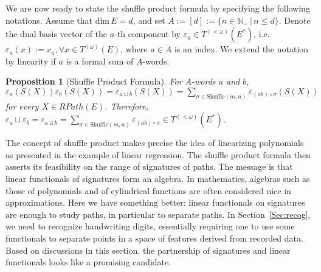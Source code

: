\documentclass[fleqn]{article}
\newtheorem{prop}[thm]{Proposition}
\theoremstyle{definition}
\theoremstyle{remark}
\begin{document}
\par
We are now ready to state the shuffle product formula by specifying the following notations. Assume that $\mathrm{dim}\,E =d$, and set $A:=[d]:=\{n\in\mathbb{N}_+ \,\big|\, n\le d\}$. Denote the dual basis vector of the $a$-th component by $\varepsilon_a \in T^{(<\omega)}(E^*)$, i.e. $\varepsilon_a(x):=x_a,\forall x\in T^{(\omega)}(E)$, where $a\in A$ is an index. We extend the notation by linearity if $a$ is a formal sum of $A$-words.
\begin{prop}[Shuffle Product Formula]
For $A$-words $a$ and $b$, $\varepsilon_a(S(X)) \varepsilon_b(S(X)) = \varepsilon_{a\sqcup b}(S(X)) = \sum_{\sigma\in \mathrm{Shuffle}(m,n)}\varepsilon_{(ab)\circ\sigma}(S(X))$ for every $X\in RPath(E)$. Therefore, $\varepsilon_a \sqcup \varepsilon_b = \varepsilon_{a\sqcup b} = \sum_{\sigma\in \mathrm{Shuffle}(m,n)}\varepsilon_{(ab)\circ\sigma} \in T^{(<\omega)}(E^*)$.
\end{prop}

\par
The concept of shuffle product makes precise the idea of linearizing polynomials as presented in the example of linear regression. The shuffle product formula then asserts its feasibility on the range of signatures of paths. The message is that linear functionals of signatures form an algebra. In mathematics, algebras such as those of polynomials and of cylindrical functions are often considered nice in approximations. Here we have something better: linear functionals on signatures are enough to study paths, in particular to separate paths. In Section~\ref{Sec:recog}, we need to recognize handwriting digits, essentially requiring one to use some functionals to separate points in a space of features derived from recorded data. Based on discussions in this section, the partnership of signatures and linear functionals looks like a promising candidate.

\end{document}
